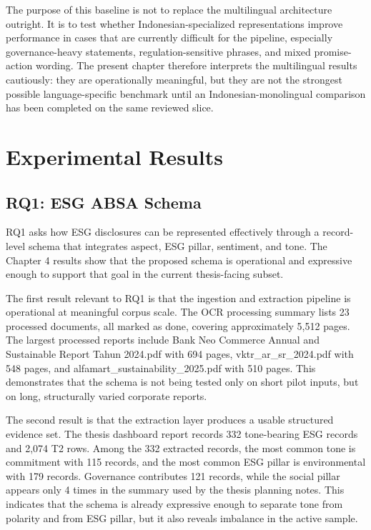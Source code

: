\documentclass[english, online, cse, master]{dithesis}
\begin{document}
The purpose of this baseline is not to replace the multilingual architecture outright. It is to test whether Indonesian-specialized representations improve performance in cases that are currently difficult for the pipeline, especially governance-heavy statements, regulation-sensitive phrases, and mixed promise-action wording. The present chapter therefore interprets the multilingual results cautiously: they are operationally meaningful, but they are not the strongest possible language-specific benchmark until an Indonesian-monolingual comparison has been completed on the same reviewed slice.

\section{Experimental Results}

\subsection{RQ1: ESG ABSA Schema}

RQ1 asks how ESG disclosures can be represented effectively through a record-level schema that integrates aspect, ESG pillar, sentiment, and tone. The Chapter 4 results show that the proposed schema is operational and expressive enough to support that goal in the current thesis-facing subset.

The first result relevant to RQ1 is that the ingestion and extraction pipeline is operational at meaningful corpus scale. The OCR processing summary lists 23 processed documents, all marked as done, covering approximately 5,512 pages. The largest processed reports include Bank Neo Commerce Annual and Sustainable Report Tahun 2024.pdf with 694 pages, vktr\_ar\_sr\_2024.pdf with 548 pages, and alfamart\_sustainability\_2025.pdf with 510 pages. This demonstrates that the schema is not being tested only on short pilot inputs, but on long, structurally varied corporate reports.

The second result is that the extraction layer produces a usable structured evidence set. The thesis dashboard report records 332 tone-bearing ESG records and 2,074 T2 rows. Among the 332 extracted records, the most common tone is commitment with 115 records, and the most common ESG pillar is environmental with 179 records. Governance contributes 121 records, while the social pillar appears only 4 times in the summary used by the thesis planning notes. This indicates that the schema is already expressive enough to separate tone from polarity and from ESG pillar, but it also reveals imbalance in the active sample.
\end{document}
